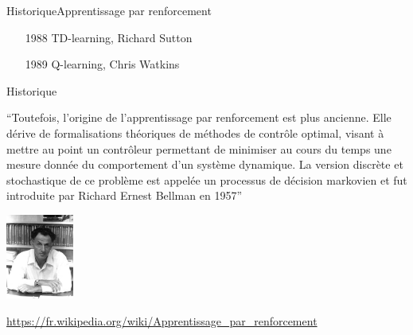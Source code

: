 \documentclass{beamer}
\begin{document}
\begin{frame}{Historique}{Apprentissage par renforcement}
  \begin{itemize}
  \item[1988] TD-learning, Richard Sutton\hspace{1em}
    
  \item[1989] Q-learning,  Chris Watkins\hspace{1.8em}
    
  \end{itemize}
\end{frame}
  
\begin{frame}{Historique}

``Toutefois, l'origine de l'apprentissage par renforcement est plus
ancienne. Elle dérive de formalisations théoriques de méthodes de
contrôle optimal, visant à mettre au point un contrôleur permettant de
minimiser au cours du temps une mesure donnée du comportement d'un
système dynamique. La version discrète et stochastique de ce problème
est appelée un processus de décision markovien et fut introduite par
Richard Ernest Bellman en 1957''

\centering
\includegraphics[width=6em]{figs/Bellman.jpg}

\hfill \scriptsize \url{https://fr.wikipedia.org/wiki/Apprentissage_par_renforcement}

\end{frame}
\end{document}
